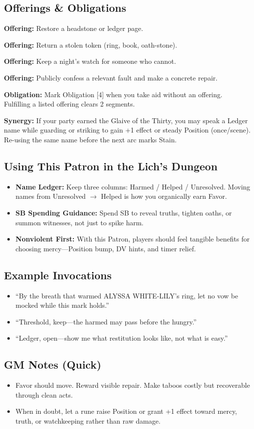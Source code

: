 \documentclass[18pt, letterpaper, twoside]{article}
\newcommand{\offering}[1]{\noindent\textbf{Offering:} #1\par}
\newcommand{\obligation}[1]{\noindent\textbf{Obligation:} #1\par}
\newcommand{\synergy}[1]{\noindent\textbf{Synergy:} #1\par}
\begin{document}
\subsection{Offerings \& Obligations}
\offering{Restore a headstone or ledger page.}
\offering{Return a stolen token (ring, book, oath-stone).}
\offering{Keep a night's watch for someone who cannot.}
\offering{Publicly confess a relevant fault and make a concrete repair.}

\obligation{Mark Obligation [4] when you take aid without an offering. Fulfilling a listed offering clears 2 segments.}

\synergy{If your party earned the Glaive of the Thirty, you may speak a Ledger name while guarding or striking to gain +1 effect or steady Position (once/scene). Re-using the same name before the next arc marks Stain.}

\subsection{Using This Patron in the Lich's Dungeon}
\begin{itemize}
    \item \textbf{Name Ledger:} Keep three columns: Harmed / Helped / Unresolved. Moving names from Unresolved $\rightarrow$ Helped is how you organically earn Favor.
    \item \textbf{SB Spending Guidance:} Spend SB to reveal truths, tighten oaths, or summon witnesses, not just to spike harm.
    \item \textbf{Nonviolent First:} With this Patron, players should feel tangible benefits for choosing mercy---Position bump, DV hints, and timer relief.
\end{itemize}

\subsection{Example Invocations}
\begin{itemize}
    \item ``By the breath that warmed ALYSSA WHITE-LILY's ring, let no vow be mocked while this mark holds.''
    \item ``Threshold, keep---the harmed may pass before the hungry.''
    \item ``Ledger, open---show me what restitution looks like, not what is easy.''
\end{itemize}

\subsection{GM Notes (Quick)}
\begin{itemize}
    \item Favor should move. Reward visible repair. Make taboos costly but recoverable through clean acts.
    \item When in doubt, let a rune raise Position or grant +1 effect toward mercy, truth, or watchkeeping rather than raw damage.
\end{itemize}
\end{document}
